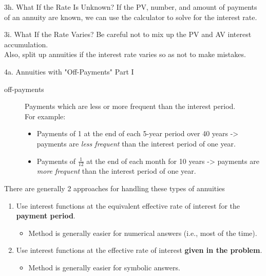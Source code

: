 \begin{CHPT_SUMM_AUTO}[label = {L.-3h}]{3h. What If the Rate Is Unknown?}
If the PV, number, and amount of payments of an annuity are known, we can use the calculator to solve for the interest rate.
\end{CHPT_SUMM_AUTO}

\begin{CHPT_SUMM_AUTO}[label = {L.-3i}]{3i. What If the Rate Varies?}
Be careful not to mix up the PV and AV interest accumulation.\\
Also, split up annuities if the interest rate varies so as not to make mistakes.
\end{CHPT_SUMM_AUTO}

\begin{CHPT_SUMM_AUTO}[label = {L.-4a}]{4a. Annuities with "Off-Payments" Part I}
\begin{description}
	\item[off-payments]	Payments which are less or more frequent than the interest period.\\
	For example:
		\begin{itemize}[leftmargin = *]
		\item	Payments of 1 at the end of each 5-year period over 40 years -> payments are \textit{less frequent} than the interest period of one year.
		\item	Payments of $\frac{1}{12}$ at the end of each month for 10 years -> payments are \textit{more frequent} than the interest period of one year.
		\end{itemize}
\end{description}

There are generally 2 approaches for handling these types of annuities
\begin{enumerate}
	\item	Use interest functions at the equivalent effective rate of interest for the \textbf{payment period}.
		\begin{itemize}[leftmargin = *]
		\item	Method is generally easier for numerical answers (i.e., most of the time).
		\end{itemize}
	\item	Use interest functions at the effective rate of interest \textbf{given in the problem}.
		\begin{itemize}[leftmargin = *]
		\item	Method is generally easier for symbolic answers.
		\end{itemize}
\end{enumerate}


\end{CHPT_SUMM_AUTO}
